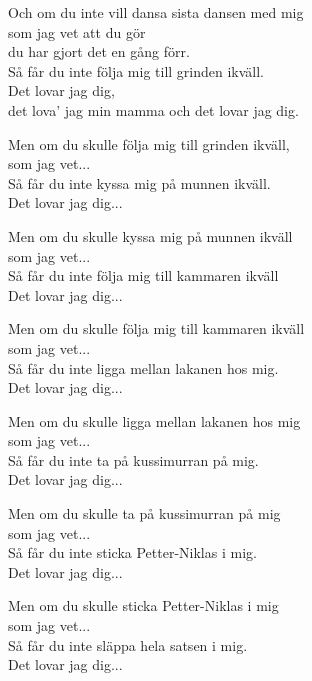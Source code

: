 \vspace{8pt}
{Och om du inte vill dansa sista dansen med mig\\
som jag vet att du gör\\
du har gjort det en gång förr.\\
Så får du inte följa mig till grinden ikväll.\\
Det lovar jag dig,\\
det lova' jag min mamma och det lovar jag dig.\par
\vspace{8pt}
Men om du skulle följa mig till grinden ikväll,\\
som jag vet...\\
Så får du inte kyssa mig på munnen ikväll.\\
Det lovar jag dig...\par
\vspace{8pt}
Men om du skulle kyssa mig på munnen ikväll \\
som jag vet...\\
Så får du inte följa mig till kammaren ikväll\\
Det lovar jag dig...\par
\vspace{8pt}
Men om du skulle följa mig till kammaren ikväll\\
som jag vet...\\
Så får du inte ligga mellan lakanen hos mig.\\
Det lovar jag dig...\par
\vspace{8pt}
Men om du skulle ligga mellan lakanen hos mig\\
som jag vet...\\
Så får du inte ta på kussimurran på mig.\\
Det lovar jag dig...\par
\vspace{8pt}
Men om du skulle ta på kussimurran på mig\\
som jag vet...\\
Så får du inte sticka Petter-Niklas i mig.\\
Det lovar jag dig...}
\newpage
Men om du skulle sticka Petter-Niklas i mig\\
som jag vet...\\
Så får du inte släppa hela satsen i mig.\\
Det lovar jag dig...\par
